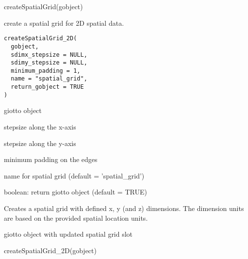 \documentclass[a4paper]{book}
\begin{document}
%
\begin{Examples}
\begin{ExampleCode}
    createSpatialGrid(gobject)
\end{ExampleCode}
\end{Examples}
%
\begin{Description}\relax
create a spatial grid for 2D spatial data.
\end{Description}
%
\begin{Usage}
\begin{verbatim}
createSpatialGrid_2D(
  gobject,
  sdimx_stepsize = NULL,
  sdimy_stepsize = NULL,
  minimum_padding = 1,
  name = "spatial_grid",
  return_gobject = TRUE
)
\end{verbatim}
\end{Usage}
%
\begin{Arguments}
\begin{ldescription}
\item[\code{gobject}] giotto object

\item[\code{sdimx\_stepsize}] stepsize along the x-axis

\item[\code{sdimy\_stepsize}] stepsize along the y-axis

\item[\code{minimum\_padding}] minimum padding on the edges

\item[\code{name}] name for spatial grid (default = 'spatial\_grid')

\item[\code{return\_gobject}] boolean: return giotto object (default = TRUE)
\end{ldescription}
\end{Arguments}
%
\begin{Details}\relax
Creates a spatial grid with defined x, y (and z) dimensions.
The dimension units are based on the provided spatial location units.
\end{Details}
%
\begin{Value}
giotto object with updated spatial grid slot
\end{Value}
%
\begin{Examples}
\begin{ExampleCode}
    createSpatialGrid_2D(gobject)
\end{ExampleCode}
\end{Examples}
\end{document}
